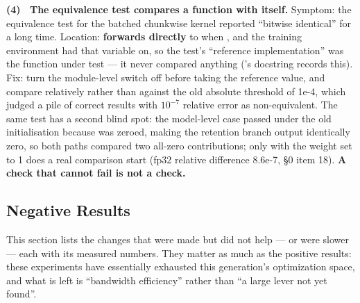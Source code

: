 \documentclass[11pt,openany]{article}
\begin{document}
\textbf{(4) \ The equivalence test compares a function with itself.} Symptom: the equivalence test
for the batched chunkwise kernel reported ``bitwise identical'' for a long time. Location:
\linebreak[0]\linebreak[0] \textbf{forwards directly} to \linebreak[0] when
\linebreak[0]\linebreak[0], and the training environment had that variable on, so the test's
``reference implementation'' was the function under test --- it never compared anything
(\linebreak[0]\linebreak[0]\linebreak[0]'s \linebreak[0] docstring records this). Fix: turn
the module-level switch off before taking the reference value, and compare relatively rather than
against the old absolute threshold of 1e-4, which judged a pile of correct results with
$10^{-7}$ relative error as non-equivalent. The same test has a second blind spot: the model-level
case passed under the old initialisation because \linebreak[0] was zeroed, making the
retention branch output identically zero, so both paths compared two all-zero contributions; only
with the weight set to 1 does a real comparison start (fp32 relative difference 8.6e-7,
 \S0 item 18). \textbf{A check that cannot fail is not a check.}

\subsection{Negative Results}

This section lists the changes that were made but did not help --- or were slower --- each with its
measured numbers. They matter as much as the positive results: these experiments have essentially
exhausted this generation's optimization space, and what is left is ``bandwidth efficiency''
rather than ``a large lever not yet found''.
\end{document}
